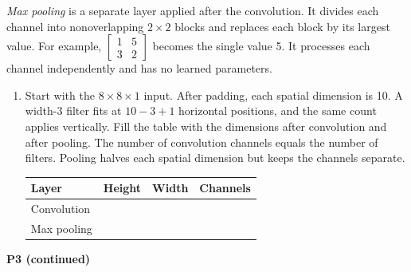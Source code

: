 \documentclass[11pt]{article}
\newenvironment{studentanswer}[1]
  {\par\medskip\noindent
   \begin{tcolorbox}[height from=#1 to 100cm, colback=white, colframe=gray!60,
     boxrule=0.6pt, arc=0pt, outer arc=0pt, left=7pt, right=7pt,
     top=7pt, bottom=7pt, title={Answer / work}, fonttitle=\small,
     coltitle=black, colbacktitle=gray!8, titlerule=0pt]
   \ignorespaces}
  {\end{tcolorbox}\par}
\begin{document}
\emph{Max pooling} is a separate layer applied after the convolution.
It divides each channel into nonoverlapping $2\times2$ blocks and
replaces each block by its largest value. For example,
$\begin{bmatrix}1&5\\3&2\end{bmatrix}$ becomes the single value 5.
It processes each channel independently and has no learned parameters.
\begin{enumerate}[label=(\alph*)]
\item \begin{minipage}[t]{\linewidth} Start with the $8\times8\times1$ input. After padding, each
spatial dimension is 10. A width-3 filter fits at $10-3+1$ horizontal
positions, and the same count applies vertically.
Fill the table with the dimensions after convolution and after pooling.
The number of convolution channels equals the number of filters.
Pooling halves each spatial dimension but keeps the channels separate.

\begin{studentanswer}{4.5cm}
\begin{center}
\renewcommand{\arraystretch}{1.4}
\begin{tabular}{l|c|c|c}
Layer & Height & Width & Channels\\\hline
Convolution & & &\\\hline
Max pooling & & &\\\hline
\end{tabular}
\end{center}
\end{studentanswer}

\end{minipage}
\end{enumerate}
\clearpage
\noindent\textbf{P3 (continued)}
\end{document}
